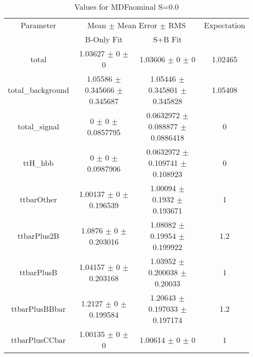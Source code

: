 \begin{table}
\centering
\caption{Values for MDFnominal S=0.0}
\begin{tabular}{cccc}
\toprule
Parameter & \multicolumn{2}{c}{Mean $\pm$ Mean Error $\pm$ RMS} & Expectation\\
 & B-Only Fit & S+B Fit & \\
\midrule
total & \num{1.03627} $\pm$ \num{0} $\pm$ \num{0} & \num{1.03606} $\pm$ \num{0} $\pm$ \num{0} & \num{1.02465}\\
total\_background & \num{1.05586} $\pm$ \num{0.345666} $\pm$ \num{0.345687} & \num{1.05446} $\pm$ \num{0.345801} $\pm$ \num{0.345828} & \num{1.05408}\\
total\_signal & \num{0} $\pm$ \num{0} $\pm$ \num{0.0857795} & \num{0.0632972} $\pm$ \num{0.088877} $\pm$ \num{0.0886418} & \num{0}\\
ttH\_hbb & \num{0} $\pm$ \num{0} $\pm$ \num{0.0987906} & \num{0.0632972} $\pm$ \num{0.109741} $\pm$ \num{0.108923} & \num{0}\\
ttbarOther & \num{1.00137} $\pm$ \num{0} $\pm$ \num{0.196539} & \num{1.00094} $\pm$ \num{0.1932} $\pm$ \num{0.193671} & \num{1}\\
ttbarPlus2B & \num{1.0876} $\pm$ \num{0} $\pm$ \num{0.203016} & \num{1.08082} $\pm$ \num{0.19954} $\pm$ \num{0.199922} & \num{1.2}\\
ttbarPlusB & \num{1.04157} $\pm$ \num{0} $\pm$ \num{0.203168} & \num{1.03952} $\pm$ \num{0.200038} $\pm$ \num{0.20033} & \num{1}\\
ttbarPlusBBbar & \num{1.2127} $\pm$ \num{0} $\pm$ \num{0.199584} & \num{1.20643} $\pm$ \num{0.197033} $\pm$ \num{0.197174} & \num{1.2}\\
ttbarPlusCCbar & \num{1.00135} $\pm$ \num{0} $\pm$ \num{0} & \num{1.00614} $\pm$ \num{0} $\pm$ \num{0} & \num{1}\\
\bottomrule
\end{tabular}
\end{table}